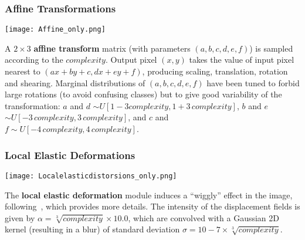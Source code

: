 \documentclass[smallcondensed]{svjour3}     %
\begin{document}

\subsubsection*{Affine Transformations}

\begin{minipage}[b]{0.14\linewidth}
\begin{center}
\texttt{[image: Affine\_only.png]}
\vspace*{6mm}
\end{center}
\end{minipage}%
\hspace{0.3cm}\begin{minipage}[b]{0.86\linewidth}
\noindent A $2 \times 3$ {\bf affine transform} matrix (with
parameters $(a,b,c,d,e,f)$) is sampled according to the $complexity$.
Output pixel $(x,y)$ takes the value of input pixel
nearest to $(ax+by+c,dx+ey+f)$,
producing scaling, translation, rotation and shearing.
Marginal distributions of $(a,b,c,d,e,f)$ have been tuned to
forbid large rotations (to avoid confusing classes) but to give good
variability of the transformation: $a$ and $d$ $\sim U[1-3
complexity,1+3\,complexity]$, $b$ and $e$ $\sim U[-3 \,complexity,3\,
complexity]$, and $c$ and $f \sim U[-4 \,complexity, 4 \,
complexity]$.\\
\end{minipage}

\subsubsection*{Local Elastic Deformations}

\begin{minipage}[b]{0.14\linewidth}
\begin{center}
\vspace*{5mm}
\texttt{[image: Localelasticdistorsions\_only.png]}
\end{center}
\end{minipage}%
\hspace{3mm}
\begin{minipage}[b]{0.85\linewidth}
The {\bf local elastic deformation}
module induces a ``wiggly'' effect in the image, following~\citet{SimardSP03-short},
which provides more details. 
The intensity of the displacement fields is given by 
$\alpha = \sqrt[3]{complexity} \times 10.0$, which are 
convolved with a Gaussian 2D kernel (resulting in a blur) of
standard deviation $\sigma = 10 - 7 \times\sqrt[3]{complexity}$.
\vspace{2mm}
\end{minipage}
\end{document}
